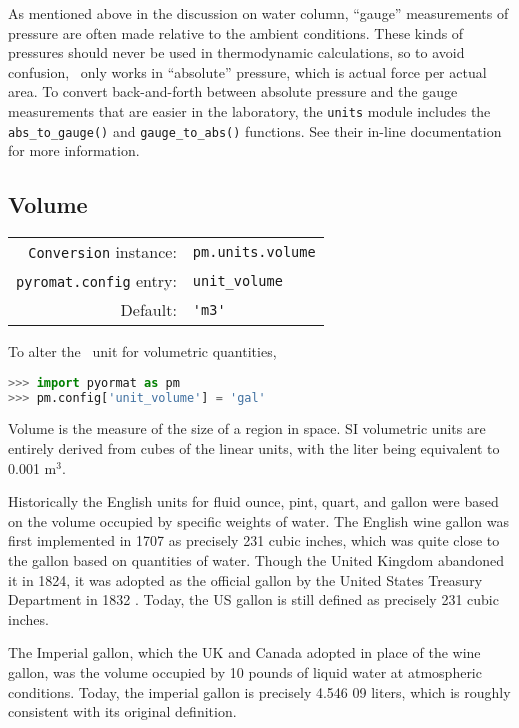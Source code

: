 As mentioned above in the discussion on water column, ``gauge'' measurements of pressure are often made relative to the ambient conditions.  These kinds of pressures should never be used in thermodynamic calculations, so to avoid confusion, \PM\ only works in ``absolute'' pressure, which is actual force per actual area.  To convert back-and-forth between absolute pressure and the gauge measurements that are easier in the laboratory, the \texttt{units} module includes the \verb|abs_to_gauge()| and \verb|gauge_to_abs()| functions.  See their in-line documentation for more information.

%
%

\subsection{Volume}\label{sec:units:volume}

\begin{tabular}{rl}
\hline
\verb|Conversion| instance: & \verb|pm.units.volume|\\
\verb|pyromat.config| entry: & \verb|unit_volume|\\
Default: & \verb|'m3'|\\
\hline
\end{tabular}
\vspace{1em}

To alter the \PM\ unit for volumetric quantities,
\begin{lstlisting}[language=Python]
>>> import pyormat as pm
>>> pm.config['unit_volume'] = 'gal'
\end{lstlisting}

Volume is the measure of the size of a region in space.  SI volumetric units are entirely derived from cubes of the linear units, with the liter being equivalent to 0.001 m$^3$.

Historically the English units for fluid ounce, pint, quart, and gallon were based on the volume occupied by specific weights of water.  The English wine gallon was first implemented in 1707 as precisely 231 cubic inches, which was quite close to the gallon based on quantities of water.  Though the United Kingdom abandoned it in 1824, it was adopted as the official gallon by the United States Treasury Department in 1832 \cite[p.]{nbs:sp447}.  Today, the US gallon is still defined as precisely 231 cubic inches.

The Imperial gallon, which the UK and Canada adopted in place of the wine gallon, was the volume occupied by 10 pounds of liquid water at atmospheric conditions.  Today, the imperial gallon is precisely 4.546 09 liters, which is roughly consistent with its original definition.

